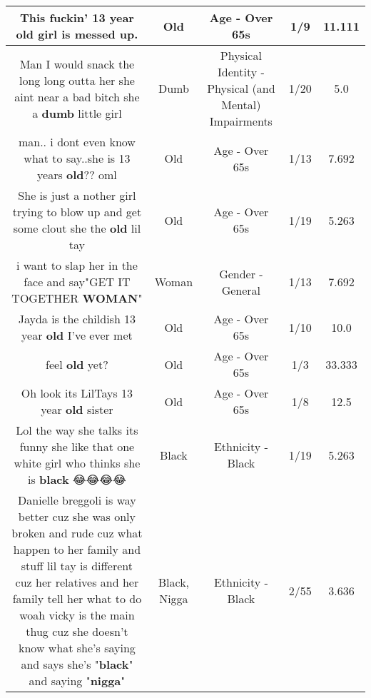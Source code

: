 \documentclass[11pt]{article}
\newlength\mylength
\begin{document}
\begin{center}
\begin{longtable}{|C{.65\mylength}|C{.30\mylength}|C{.12\mylength}|C{.12\mylength}|C{.12\mylength}|}
  \small This fuckin' 13 year \textbf{old} girl is messed up.\normalsize   & Old & Age - Over 65s & 1/9 & 11.111 \\  \hline
  \small Man I would snack the long long outta her she aint near a bad bitch she a \textbf{dumb} little girl\normalsize   & Dumb & Physical Identity - Physical (and Mental) Impairments & 1/20 & 5.0 \\  \hline
  \small man.. i dont even know what to say..she is 13 years \textbf{old}?? oml\normalsize   & Old & Age - Over 65s & 1/13 & 7.692 \\  \hline
  \small She is just a nother girl trying to blow up and get some clout she the \textbf{old} lil tay\normalsize   & Old & Age - Over 65s & 1/19 & 5.263 \\  \hline
  \small i want to slap her in the face and say"GET IT TOGETHER \textbf{WOMAN}"\normalsize   & Woman & Gender - General & 1/13 & 7.692 \\  \hline
  \small Jayda is the childish 13 year \textbf{old} I've ever met\normalsize   & Old & Age - Over 65s & 1/10 & 10.0 \\  \hline
  \small feel \textbf{old} yet?\normalsize   & Old & Age - Over 65s & 1/3 & 33.333 \\  \hline
  \small Oh look its LilTays 13 year \textbf{old} sister\normalsize   & Old & Age - Over 65s & 1/8 & 12.5 \\  \hline
  \small Lol the way she talks its funny she like that one white girl who thinks she is \textbf{black} 😂😂😂😂\normalsize   & Black & Ethnicity - Black & 1/19 & 5.263 \\  \hline
  \small Danielle breggoli is way better cuz she was only broken and rude cuz what happen to her family and stuff lil tay is different cuz her relatives and her family tell her what to do woah vicky is the main thug cuz she doesn't know what she's saying and says she's "\textbf{black}" and saying "\textbf{nigga}"\normalsize   & Black, Nigga & Ethnicity - Black & 2/55 & 3.636 \\  \hline

\end{longtable}
\end{center}
\end{document}
